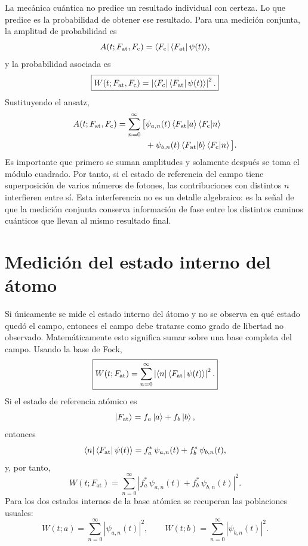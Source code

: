 \documentclass[11pt]{article}
\begin{document}
La mec\'anica cu\'antica no predice un resultado individual con certeza. Lo que
predice es la probabilidad de obtener ese resultado. Para una medici\'on
conjunta, la amplitud de probabilidad es
\begin{equation}
  A(t;F_{\mathrm{at}},F_{\mathrm{c}})
  =
  \bra{F_{\mathrm{c}}}\bra{F_{\mathrm{at}}}\psi(t)\rangle,
\end{equation}
y la probabilidad asociada es
\begin{equation}
  \boxed{
  W(t;F_{\mathrm{at}},F_{\mathrm{c}})
  =
  \left|
  \bra{F_{\mathrm{c}}}\bra{F_{\mathrm{at}}}\psi(t)\rangle
  \right|^2 .
  }
\end{equation}
Sustituyendo el ansatz,
\begin{align}
  A(t;F_{\mathrm{at}},F_{\mathrm{c}})
  =
  \sum_{n=0}^{\infty}
  \big[
  &\psi_{a,n}(t)
  \braket{F_{\mathrm{at}}|a}
  \braket{F_{\mathrm{c}}|n}
  \notag\\
  &+
  \psi_{b,n}(t)
  \braket{F_{\mathrm{at}}|b}
  \braket{F_{\mathrm{c}}|n}
  \big].
\end{align}
Es importante que primero se suman amplitudes y solamente despu\'es se toma el
m\'odulo cuadrado. Por tanto, si el estado de referencia del campo tiene
superposici\'on de varios n\'umeros de fotones, las contribuciones con
distintos $n$ interfieren entre s\'i. Esta interferencia no es un detalle
algebraico: es la se\~nal de que la medici\'on conjunta conserva informaci\'on
de fase entre los distintos caminos cu\'anticos que llevan al mismo resultado
final.

\section{Medici\'on del estado interno del \'atomo}

Si \'unicamente se mide el estado interno del \'atomo y no se observa en qu\'e
estado qued\'o el campo, entonces el campo debe tratarse como grado de libertad
no observado. Matem\'aticamente esto significa sumar sobre una base completa
del campo. Usando la base de Fock,
\begin{equation}
  \boxed{
  W(t;F_{\mathrm{at}})
  =
  \sum_{n=0}^{\infty}
  \left|
  \bra{n}\bra{F_{\mathrm{at}}}\psi(t)\rangle
  \right|^2 .
  }
\end{equation}
Si el estado de referencia at\'omico es
\begin{equation}
  \ket{F_{\mathrm{at}}}=f_a\ket{a}+f_b\ket{b},
\end{equation}
entonces
\begin{equation}
  \bra{n}\bra{F_{\mathrm{at}}}\psi(t)\rangle
  =
  f_a^*\,\psi_{a,n}(t)
  +
  f_b^*\,\psi_{b,n}(t),
\end{equation}
y, por tanto,
\begin{equation}
  W(t;F_{\mathrm{at}})
  =
  \sum_{n=0}^{\infty}
  \left|
  f_a^*\,\psi_{a,n}(t)
  +
  f_b^*\,\psi_{b,n}(t)
  \right|^2 .
\end{equation}
Para los dos estados internos de la base at\'omica se recuperan las
poblaciones usuales:
\begin{equation}
  W(t;a)=\sum_{n=0}^{\infty}|\psi_{a,n}(t)|^2,
  \qquad
  W(t;b)=\sum_{n=0}^{\infty}|\psi_{b,n}(t)|^2.
\end{equation}
\end{document}
